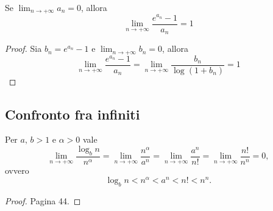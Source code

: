 \begin{remark}
    Se $\lim_{n\rightarrow+\infty}a_n=0$, allora
    \begin{equation*}
        \lim_{n\rightarrow+\infty}\frac{e^{a_n}-1}{a_n}=1
    \end{equation*}
\end{remark}
\begin{proof}
    Sia $b_n=e^{a_n}-1$ e $\lim_{n\rightarrow+\infty}b_n=0$, allora
    \begin{equation*}
        \lim_{n\rightarrow+\infty}\frac{e^{a_n}-1}{a_n}=\lim_{n\rightarrow+\infty}\frac{b_n}{\log(1+b_n)}=1
    \end{equation*}
\end{proof}

\subsection{Confronto fra infiniti}
\begin{theorem}
    Per $a,\,b>1$ e $\alpha>0$ vale
    \begin{equation*}
        \lim_{n\rightarrow+\infty}\frac{\log_b n}{n^\alpha}=\lim_{n\rightarrow+\infty}\frac{n^\alpha}{a^n}=\lim_{n\rightarrow+\infty}\frac{a^n}{n!}=\lim_{n\rightarrow+\infty}\frac{n!}{n^n}=0,
    \end{equation*}
    ovvero
    \begin{equation*}
        \log_b n<n^\alpha<a^n<n!<n^n.
    \end{equation*}
\end{theorem}
\begin{proof}
    Pagina 44.
\end{proof}